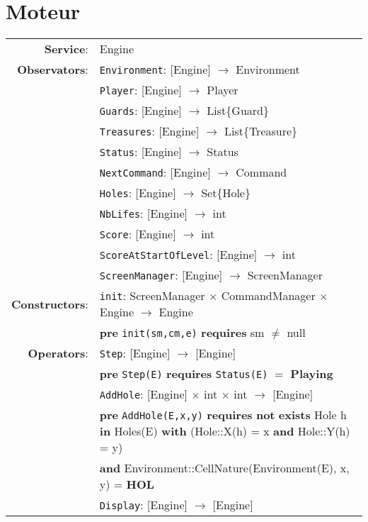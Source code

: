 \documentclass[7pt]{article}
\begin{document}
\newpage

\section*{Moteur}

\begin{tabular}{rl}
\textbf{Service}: & \textrm{Engine} \\
{\textbf{Observators}}: &\texttt{Environment}: \textrm{[Engine]}  $\rightarrow$ \textrm{Environment}  \\
&\texttt{Player}: \textrm{[Engine]}  $\rightarrow$ \textrm{Player}  \\
&\texttt{Guards}: \textrm{[Engine]}  $\rightarrow$ \textrm{List\{Guard\}}  \\
&\texttt{Treasures}: \textrm{[Engine]}  $\rightarrow$ \textrm{List\{Treasure\}}  \\
&\texttt{Status}: \textrm{[Engine]}  $\rightarrow$ \textrm{Status}  \\
&\texttt{NextCommand}: \textrm{[Engine]}  $\rightarrow$ \textrm{Command}  \\
&\texttt{Holes}: \textrm{[Engine]}  $\rightarrow$ \textrm{Set\{Hole\}}  \\
&\texttt{NbLifes}: \textrm{[Engine]}  $\rightarrow$ \textrm{int}  \\
&\texttt{Score}: \textrm{[Engine]}  $\rightarrow$ \textrm{int}  \\
&\texttt{ScoreAtStartOfLevel}: \textrm{[Engine]}  $\rightarrow$ \textrm{int}  \\
&\texttt{ScreenManager}: \textrm{[Engine]}  $\rightarrow$ \textrm{ScreenManager}  \\

\textbf{Constructors}: & \texttt{init}: \textrm{ScreenManager} $\times$ \textrm{CommandManager} $\times$ \textrm{Engine}  $\rightarrow$ \textrm{Engine} \\
& \quad\quad \textbf{pre} \texttt{init(sm,cm,e)} \textbf{requires} sm $\neq$ null \\


\textbf{Operators}: & \texttt{Step}: \textrm{[Engine]} $\rightarrow$ \textrm{[Engine]}\\
& \quad\quad \textbf{pre} \texttt{Step(E)} \textbf{requires} \texttt{Status(E)} $=$ \textbf{Playing} \\
& \texttt{AddHole}: \textrm{[Engine]} $\times$ \textrm{int} $\times$ \textrm{int} $\rightarrow$ \textrm{[Engine]}\\
& \quad\quad \textbf{pre} \texttt{AddHole(E,x,y)} \textbf{requires} \textbf{not} \textbf{exists} Hole h \textbf{in} Holes(E) \textbf{with} (Hole::X(h) = x \textbf{and} Hole::Y(h) = y) \\ & \quad\quad\quad \textbf{and} Environment::CellNature(Environment(E), x, y) = \textbf{HOL}\\
& \texttt{Display}: \textrm{[Engine]} $\rightarrow$ \textrm{[Engine]}\\


\end{tabular}
\end{document}
